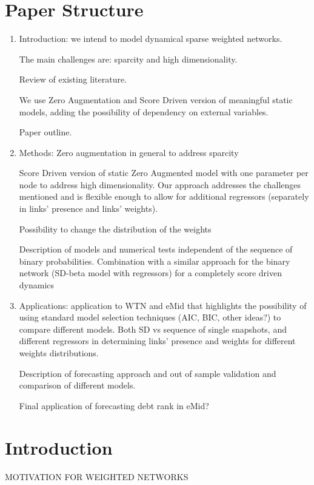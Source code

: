 \documentclass[a4paper,12pt]{article}
\begin{document}
\section*{Paper Structure}
\begin{enumerate}
\item Introduction: we intend to model dynamical sparse weighted networks. 

The main challenges are: sparcity and high dimensionality.

Review of existing literature. 

We use Zero Augmentation and Score Driven version of meaningful static models, adding the possibility of dependency on external variables.

Paper outline.
\item Methods:  Zero augmentation in general to address sparcity 

  Score Driven version of  static Zero Augmented model with one parameter per node to address high dimensionality. Our approach addresses the challenges mentioned and is flexible enough to allow for additional regressors (separately in links' presence and links' weights). 
  
  Possibility to change the distribution of the weights

Description of models and numerical tests independent of the sequence of binary probabilities. Combination with a similar approach for the binary network (SD-beta model with regressors) for a completely score driven dynamics
\item Applications:  application to WTN and eMid that highlights the possibility of using standard model selection techniques (AIC, BIC, other ideas?) to compare different models. Both SD vs sequence of single snapshots, and different regressors in determining links' presence and weights for different weights distributions. 

Description of forecasting approach and out of sample validation and comparison of different models. 

Final application of forecasting debt rank in eMid?

\end{enumerate}

\newpage
\section{Introduction}
MOTIVATION FOR WEIGHTED NETWORKS\\
\end{document}
